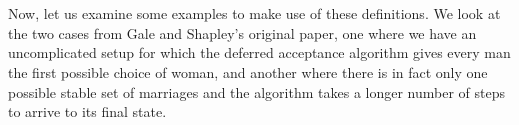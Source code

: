 {\begin{code}
\AgdaSymbol{)}\AgdaSpace{}%
\AgdaSymbol{))}\<%
\\
%
\>[10]\AgdaSymbol{(}%
\>[2550I]\AgdaSymbol{(}\AgdaSpace{}%
\AgdaSymbol{(}\AgdaSpace{}%
\AgdaSymbol{)}\AgdaSpace{}%
\AgdaOperator{\AgdaInductiveConstructor{,}}\AgdaSpace{}%
\AgdaSpace{}%
\AgdaSymbol{(}\AgdaSpace{}%
\AgdaSymbol{)}\AgdaSpace{}%
\AgdaSymbol{)}\AgdaSpace{}%
\AgdaOperator{\AgdaInductiveConstructor{,}}\<%
\\
\>[.][@{}l@{}]\<[2550I]%
\>[12]\AgdaSymbol{(}\AgdaSpace{}%
\AgdaSymbol{(}\AgdaSpace{}%
\AgdaSymbol{)}\AgdaSpace{}%
\AgdaOperator{\AgdaInductiveConstructor{,}}\AgdaSpace{}%
\AgdaSpace{}%
\AgdaSymbol{(}\AgdaSpace{}%
\AgdaSymbol{)}\AgdaSpace{}%
\AgdaSymbol{)))}\<%
\end{code}

Now, let us examine some examples to make use of these definitions. We look at the two cases from Gale and Shapley's original paper, one where we have an uncomplicated setup for which the deferred acceptance algorithm gives every man the first possible choice of woman, and another where there is in fact only one possible stable set of marriages and the algorithm takes a longer number of steps to arrive to its final state.

}
